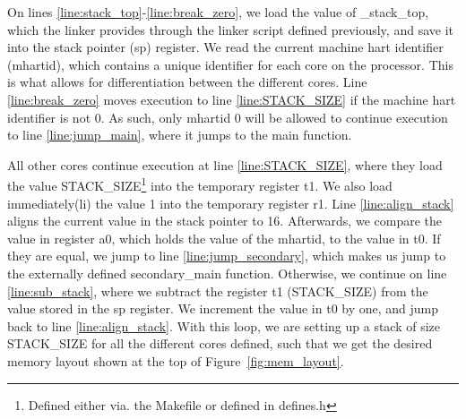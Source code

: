 On lines \ref{line:stack_top}-\ref{line:break_zero}, we load the value of
\_stack\_top, which the linker provides through the linker script defined
previously, and save it into the stack pointer (sp) register. We read the
current machine hart identifier (mhartid), which contains a unique identifier
for each core on the processor. This is what allows for differentiation between
the different cores. Line \ref{line:break_zero} moves execution to line
\ref{line:STACK_SIZE} if the machine hart identifier is not 0. As such, only
mhartid 0 will be allowed to continue execution to line \ref{line:jump_main},
where it jumps to the main function.

All other cores continue execution at line \ref{line:STACK_SIZE}, where they
load the value STACK\_SIZE\footnote{Defined either via. the Makefile or defined
in defines.h} into the temporary register t1. We also load immediately(li) the
value 1 into the temporary register r1. Line \ref{line:align_stack} aligns the
current value in the stack pointer to 16. Afterwards, we compare the value in
register a0, which holds the value of the mhartid, to the value in t0. If they
are equal, we jump to line \ref{line:jump_secondary}, which makes us jump to the
externally defined secondary\_main function. Otherwise, we continue on line
\ref{line:sub_stack}, where we subtract the register t1 (STACK\_SIZE) from the
value stored in the sp register. We increment the value in t0 by one, and jump
back to line \ref{line:align_stack}. With this loop, we are setting up a stack
of size STACK\_SIZE for all the different cores defined, such that we get the
desired memory layout shown at the top of Figure~\ref{fig:mem_layout}.

